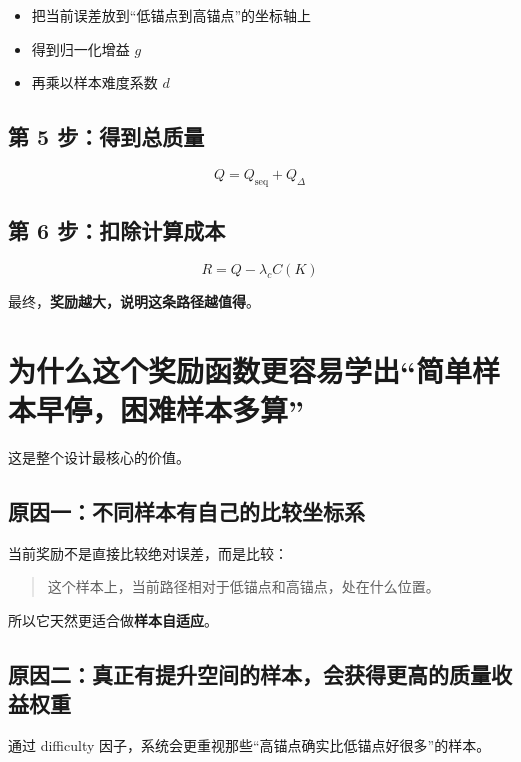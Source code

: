 \documentclass[12pt]{ctexart}
\begin{document}
\begin{itemize}
    \item 把当前误差放到“低锚点到高锚点”的坐标轴上
    \item 得到归一化增益 $g$
    \item 再乘以样本难度系数 $d$
\end{itemize}

\subsection{第 5 步：得到总质量}

\begin{equation}
    Q = Q_{\text{seq}} + Q_{\Delta}
\end{equation}

\subsection{第 6 步：扣除计算成本}

\begin{equation}
    R = Q - \lambda_c C(K)
\end{equation}

最终，\textbf{奖励越大，说明这条路径越值得}。

\section{为什么这个奖励函数更容易学出“简单样本早停，困难样本多算”}

这是整个设计最核心的价值。

\subsection{原因一：不同样本有自己的比较坐标系}

当前奖励不是直接比较绝对误差，而是比较：

\begin{quote}
    这个样本上，当前路径相对于低锚点和高锚点，处在什么位置。
\end{quote}

所以它天然更适合做\textbf{样本自适应}。

\subsection{原因二：真正有提升空间的样本，会获得更高的质量收益权重}

通过 difficulty 因子，系统会更重视那些“高锚点确实比低锚点好很多”的样本。
\end{document}
